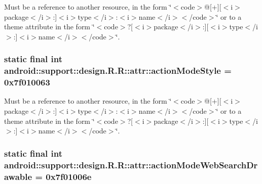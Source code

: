 Must be a reference to another resource, in the form \char`\"{}$<$code$>$@\mbox{[}+\mbox{]}\mbox{[}$<$i$>$package$<$/i$>$:\mbox{]}$<$i$>$type$<$/i$>$:$<$i$>$name$<$/i$>$$<$/code$>$\char`\"{} or to a theme attribute in the form \char`\"{}$<$code$>$?\mbox{[}$<$i$>$package$<$/i$>$:\mbox{]}\mbox{[}$<$i$>$type$<$/i$>$:\mbox{]}$<$i$>$name$<$/i$>$$<$/code$>$\char`\"{}. \hypertarget{classandroid_1_1support_1_1design_1_1_r_1_1attr_890c17917cbd99c848f40e5a4f426d79}{
\subsubsection[{actionModeStyle}]{\setlength{\rightskip}{0pt plus 5cm}static final int android::support::design.R.R::attr::actionModeStyle = 0x7f010063}}
\label{classandroid_1_1support_1_1design_1_1_r_1_1attr_890c17917cbd99c848f40e5a4f426d79}


Must be a reference to another resource, in the form \char`\"{}$<$code$>$@\mbox{[}+\mbox{]}\mbox{[}$<$i$>$package$<$/i$>$:\mbox{]}$<$i$>$type$<$/i$>$:$<$i$>$name$<$/i$>$$<$/code$>$\char`\"{} or to a theme attribute in the form \char`\"{}$<$code$>$?\mbox{[}$<$i$>$package$<$/i$>$:\mbox{]}\mbox{[}$<$i$>$type$<$/i$>$:\mbox{]}$<$i$>$name$<$/i$>$$<$/code$>$\char`\"{}. \hypertarget{classandroid_1_1support_1_1design_1_1_r_1_1attr_23d76af1d6150a4aca389d5bf94e6391}{
\subsubsection[{actionModeWebSearchDrawable}]{\setlength{\rightskip}{0pt plus 5cm}static final int android::support::design.R.R::attr::actionModeWebSearchDrawable = 0x7f01006e}}
\label{classandroid_1_1support_1_1design_1_1_r_1_1attr_23d76af1d6150a4aca389d5bf94e6391}



